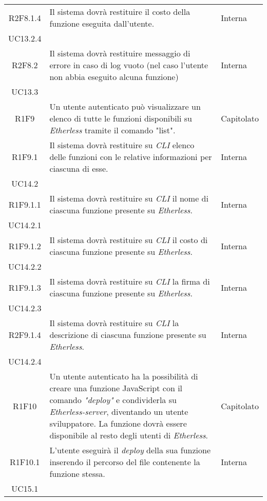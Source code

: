\begin{longtable}{|c|p{8cm}|C{2cm}|}
	R2F8.1.4 &  Il sistema dovrà restituire il costo della funzione eseguita dall'utente. & \centering Interna \\ UC13.2.4 \tabularnewline
	
	R2F8.2 &  Il sistema dovrà restituire messaggio di errore in caso di log vuoto (nel caso l'utente non abbia eseguito alcuna funzione) & \centering Interna \\ UC13.3 \tabularnewline
	
	R1F9 &  Un utente autenticato può visualizzare un elenco di tutte le funzioni disponibili su \textit{Etherless} tramite il comando "list". & Capitolato \\	
	
	R1F9.1 &  Il sistema dovrà restituire su \textit{CLI\glo} elenco delle funzioni con le relative informazioni per ciascuna di esse. & \centering Interna \\ UC14.2 \tabularnewline
	
	R1F9.1.1 &  Il sistema dovrà restituire su \textit{CLI\glo} il nome di ciascuna funzione presente su \textit{Etherless}. & \centering Interna \\ UC14.2.1 \tabularnewline
	
	R1F9.1.2 &  Il sistema dovrà restituire su \textit{CLI\glo} il costo di ciascuna funzione presente su \textit{Etherless}. & \centering Interna \\ UC14.2.2 \tabularnewline
	
	R1F9.1.3 &  Il sistema dovrà restituire su \textit{CLI\glo} la firma di ciascuna funzione presente su \textit{Etherless}. & \centering Interna \\ UC14.2.3 \tabularnewline
	
	R2F9.1.4 &  Il sistema dovrà restituire su \textit{CLI\glo} la descrizione di ciascuna funzione presente su \textit{Etherless}. & \centering Interna \\ UC14.2.4 \tabularnewline
	
	R1F10 &  Un utente autenticato ha la possibilità di creare una funzione JavaScript con il comando \textit{"deploy\glos"} e condividerla su \textit{Etherless-server}, diventando un utente sviluppatore. La funzione dovrà essere disponibile al resto degli utenti di \textit{Etherless}. & Capitolato \\
	
	R1F10.1 &  L'utente eseguirà il \textit{deploy\glo} della sua funzione inserendo il percorso del file contenente la funzione stessa. & \centering Interna \\ UC15.1 \tabularnewline
	

\end{longtable}
